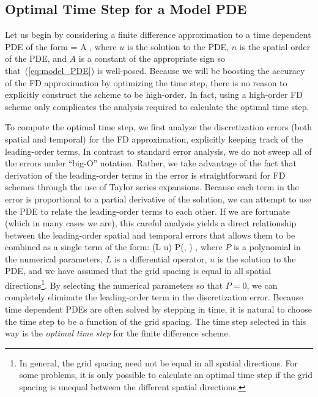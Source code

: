 \documentclass[oneeqnum,onefignum,onetabnum,onethmnum]{siamltex}
\begin{document}
\subsection{\label{sec:ots_model_pde} 
            Optimal Time Step for a Model PDE}
Let us begin by considering a finite difference approximation to a 
time dependent PDE of the form
\beq
   = A ,
  \label{eq:model_PDE}
\eeq
where $u$ is the solution to the PDE, $n$ is the spatial order of the 
PDE, and $A$ is a constant of the appropriate sign so that~(\ref{eq:model_PDE}) 
is well-posed.  Because we will be boosting the accuracy of the FD 
approximation by optimizing the time step, there is no reason to explicitly
construct the scheme to be high-order.  In fact, using a high-order FD scheme 
only complicates the analysis required to calculate the optimal time 
step.  

To compute the optimal time step, we first analyze the discretization errors 
(both spatial and temporal) for the FD approximation, explicitly keeping track 
of the leading-order terms.  In contrast to standard error analysis, we do 
not sweep all of the errors under ``big-O'' notation.  Rather, we take 
advantage of the fact that derivation of the leading-order terms in the 
error is straightforward for FD schemes through the use of Taylor series 
expansions.  Because each term in the error is proportional to a partial 
derivative of the solution, we can attempt to use the PDE to relate the 
leading-order terms to each other.  If we are fortunate (which in many cases 
we are), this careful analysis yields a direct relationship between the 
leading-order spatial and temporal errors that allows them to be combined as 
a single term of the form:
\beq
  (L u) P(\dx, \dt) ,
  \label{eq:leading_order_error_model_PDE_general}
\eeq
where $P$ is a polynomial in the numerical parameters, $L$ is a differential 
operator, $u$ is the solution to the PDE, and we have assumed that the 
grid spacing is equal in all spatial directions\footnote{In general, the grid 
spacing need not be equal in all spatial directions.  For some problems, it is 
only possible to calculate an optimal time step if the grid spacing is
unequal between the different spatial directions.}.  By selecting the 
numerical parameters so that $P = 0$, we can completely eliminate the 
leading-order term in the discretization error.  Because time dependent PDEs 
are often solved by stepping in time, it is natural to choose the time step 
to be a function of the grid spacing.  The time step selected in this way 
is the \emph{optimal time step} for the finite difference scheme.  
\end{document}
